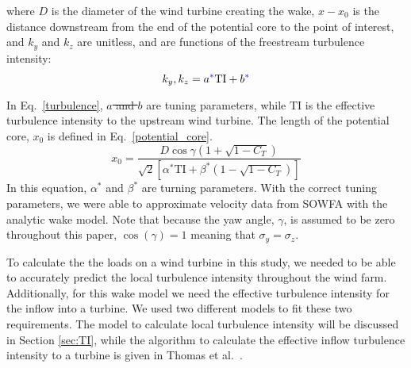 \documentclass[11pt,letterpaper]{article}
\providecommand{\DIFadd}[1]{{\protect\color{blue}\uwave{#1}}} %
\providecommand{\DIFdel}[1]{{\protect\color{red}\sout{#1}}}                      %
\providecommand{\DIFaddbegin}{} %
\providecommand{\DIFaddend}{} %
\providecommand{\DIFdelbegin}{} %
\providecommand{\DIFdelend}{} %
\newcommand{\DIFscaledelfig}{0.5}
\newlength{\DIFdelgraphicswidth} %
\newlength{\DIFdelgraphicsheight} %
\newcommand{\DIFaddincludegraphics}[2][]{{\color{blue}\fbox{\DIFOincludegraphics[#1]{#2}}}} %
\newcommand{\DIFdelincludegraphics}[2][]{%
\sbox{\DIFdelgraphicsbox}{\DIFOincludegraphics[#1]{#2}}%
\settoboxwidth{\DIFdelgraphicswidth}{\DIFdelgraphicsbox} %
\settoboxtotalheight{\DIFdelgraphicsheight}{\DIFdelgraphicsbox} %
\scalebox{\DIFscaledelfig}{%
\parbox[b]{\DIFdelgraphicswidth}{\usebox{\DIFdelgraphicsbox}\\[-\baselineskip] \rule{\DIFdelgraphicswidth}{0em}}\llap{\resizebox{\DIFdelgraphicswidth}{\DIFdelgraphicsheight}{%
\setlength{\unitlength}{\DIFdelgraphicswidth}%
\begin{picture}(1,1)%
\thicklines\linethickness{2pt} %
{\color[rgb]{1,0,0}\put(0,0){\framebox(1,1){}}}%
{\color[rgb]{1,0,0}\put(0,0){\line( 1,1){1}}}%
{\color[rgb]{1,0,0}\put(0,1){\line(1,-1){1}}}%
\end{picture}%
}\hspace*{3pt}}} %
} %
\DeclareRobustCommand{\DIFaddbegin}{\DIFOaddbegin \let\includegraphics\DIFaddincludegraphics} %
\DeclareRobustCommand{\DIFaddend}{\DIFOaddend \let\includegraphics\DIFOincludegraphics} %
\DeclareRobustCommand{\DIFdelbegin}{\DIFOdelbegin \let\includegraphics\DIFdelincludegraphics} %
\DeclareRobustCommand{\DIFdelend}{\DIFOaddend \let\includegraphics\DIFOincludegraphics} %
\begin{document}
%
\noindent where $D$ is the diameter of the wind turbine creating the wake, $x-x_0$ is the distance downstream from the end of the potential core to the point of interest, and $k_y$ and $k_z$ are unitless, and are functions of the freestream turbulence intensity:
%
\begin{equation}
    \label{turbulence}
    k_y,k_z = a\DIFaddbegin \DIFadd{^*}\DIFaddend \text{TI}+b\DIFaddbegin \DIFadd{^*
}\DIFaddend \end{equation}
%
In Eq.~\ref{turbulence}, \DIFdelbegin \DIFdel{$a$ and $b$ }\DIFdelend \DIFaddbegin \DIFadd{$a^*$ and $b^*$ }\DIFaddend are tuning parameters, while $\text{TI}$ is the effective turbulence intensity to the upstream wind turbine. 
The length of the potential core, $x_0$ is defined in Eq.~\ref{potential_core}.
%
\begin{equation}
    \label{potential_core}
    x_0 = \frac{D \cos{\gamma} (1 + \sqrt{1-C_T})}{\sqrt{2}[\alpha^*\text{TI} + \beta^* (1-\sqrt{1-C_T})]}
\end{equation}
% 
In this equation, $\alpha^*$ and $\beta^*$ are turning parameters.
With the correct tuning parameters, we were able to approximate velocity data from SOWFA with the analytic wake model. 
% 
Note that because the yaw angle, $\gamma$, is assumed to be zero throughout this paper, $\cos(\gamma)=1$ meaning that $\sigma_y=\sigma_z$. 

To calculate the the loads on a wind turbine in this study, we needed to be able to accurately predict the local turbulence intensity throughout the wind farm. Additionally, for this wake model we need the effective turbulence intensity for the inflow into a turbine. We used two different models to fit these two requirements. The model to calculate local turbulence intensity will be discussed in Section \ref{sec:TI}, while the algorithm to calculate the effective inflow turbulence intensity to a turbine is given in Thomas et al.~\cite{Thomas2019}.
\end{document}
